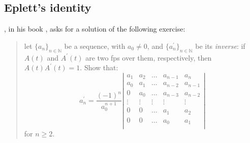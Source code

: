 
\subsection{Eplett's identity}

\citeauthor{riordan:intro:combinatorial:analysis},
in his book \cite{riordan:intro:combinatorial:analysis},
asks for a solution of the following exercise:

\begin{quote}
    let $\lbrace a_{n} \rbrace_{n\in\mathbb{N}}$ be a sequence, with $a_{0}\neq0$, 
    and $\lbrace a_{n}^{\prime} \rbrace_{n\in\mathbb{N}}$ be its \emph{inverse}:
    if $A(t)$ and $A^{\prime}(t)$ are two \ac{fps} over them, respectively, 
    then $A(t)A^{\prime}(t)=1$. Show that:
    \begin{displaymath}                
        a_{n}^{\prime} = \frac{(-1)^{n}}{a_{0}^{n+1}}
            \left|
            \begin{array}{ccccc}
                a_1 & a_2 & \ldots & a_{n-1} & a_{n}\\
                a_0 & a_1 & \ldots & a_{n-2} & a_{n-1}\\
                0   & a_0 & \ldots & a_{n-3} & a_{n-2}\\
                \vdots & \vdots & \vdots & \vdots & \vdots\\
                0 & 0 & \ldots & a_{1} & a_{2}\\
                0 & 0 & \ldots & a_{0} & a_{1}\\
            \end{array}
            \right|
    \end{displaymath}                
    for $n \geq 2$.
\end{quote}

